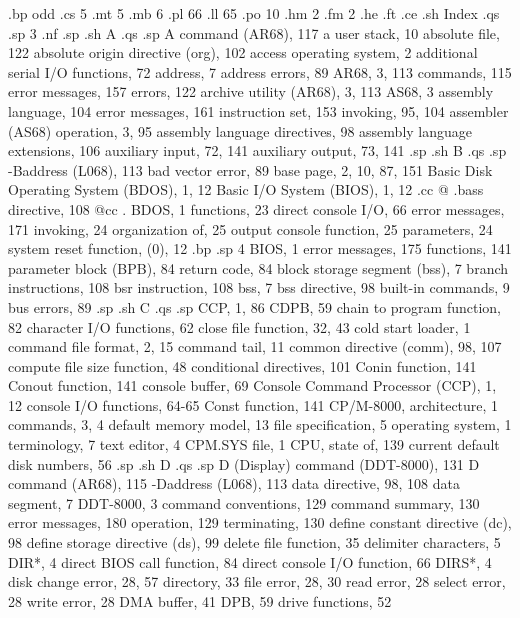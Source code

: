 .bp odd
.cs 5
.mt 5
.mb 6
.pl 66
.ll 65
.po 10
.hm 2
.fm 2
.he 
.ft 
.ce
.sh
Index
.qs
.sp 3
.nf
.sp
.sh
A
.qs
.sp
A command (AR68), 117
a user stack, 10
absolute file, 122
absolute origin directive 
    (org), 102
access operating system, 2
additional serial I/O 
    functions, 72
address, 7
address errors, 89
AR68, 3, 113
  commands, 115
  error messages, 157
  errors, 122
archive utility (AR68), 3, 113 
AS68, 3
  assembly language, 104 
  error messages, 161
  instruction set, 153
  invoking, 95, 104
assembler (AS68) operation, 
    3, 95
assembly language directives, 
    98
assembly language extensions, 
    106
auxiliary input, 72, 141
auxiliary output, 73, 141
.sp
.sh
B
.qs
.sp
-Baddress (L068), 113
bad vector error, 89
base page, 2, 10, 87, 151
Basic Disk Operating System 
    (BDOS), 1, 12
Basic I/O System (BIOS), 1, 12
.cc @
.bass directive, 108
@cc .
BDOS, 1
  functions, 23
  direct console I/O, 66
  error messages, 171  
  invoking, 24
  organization of, 25
  output console function, 25
  parameters, 24
  system reset function, (0), 12
.bp
.sp 4
BIOS, 1
  error messages, 175
  functions, 141
  parameter block (BPB), 84
  return code, 84
block storage segment (bss), 7
branch instructions, 108
bsr instruction, 108
bss, 7
bss directive, 98
built-in commands, 9
bus errors, 89
.sp
.sh
C
.qs
.sp
CCP, 1, 86
CDPB, 59
chain to program function, 82
character I/O functions, 62
close file function, 32, 43
cold start loader, 1
command file format, 2, 15
command tail, 11
common directive (comm), 98, 107
compute file size function, 48
conditional directives, 101
Conin function, 141
Conout function, 141
console buffer, 69
Console Command Processor 
    (CCP), 1, 12
console I/O functions, 64-65
Const function, 141
CP/M-8000, 
  architecture, 1
  commands, 3, 4
  default memory model, 13
  file specification, 5
  operating system, 1
  terminology, 7
  text editor, 4
CPM.SYS file, 1
CPU, state of, 139
current default disk numbers, 
    56
.sp
.sh
D 
.qs
.sp
D (Display) command (DDT-8000), 
    131
D command (AR68), 115
-Daddress (L068), 113
data directive, 98, 108
data segment, 7
DDT-8000, 3
  command conventions, 129
  command summary, 130
  error messages, 180
  operation, 129
  terminating, 130
define constant directive 
    (dc), 98
define storage directive (ds), 
    99
delete file function, 35
delimiter characters, 5
DIR*, 4
direct BIOS call function, 84
direct console I/O function, 
    66
DIRS*, 4
disk 
  change error, 28, 57
  directory, 33
  file error, 28, 30
  read error, 28
  select error, 28
  write error, 28
DMA buffer, 41
DPB, 59
drive functions, 52
